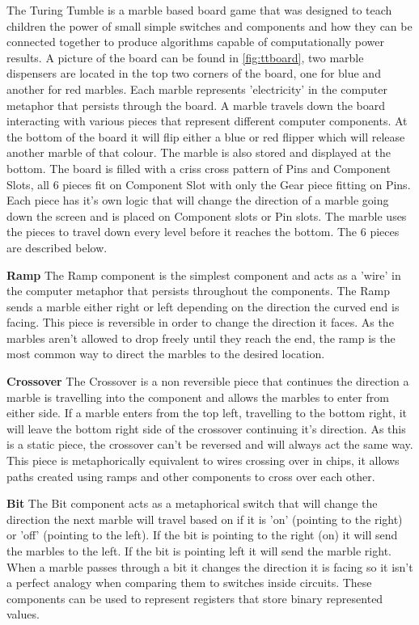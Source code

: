 \documentclass{l4proj}
\begin{document}
The Turing Tumble is a marble based board game that was designed to teach children the power of small simple switches and components and how they can be connected together to produce algorithms capable of computationally power results. A picture of the board can be found in \ref{fig:ttboard}, two marble dispensers are located in the top two corners of the board, one for blue and another for red marbles. Each marble represents 'electricity' in the computer metaphor that persists through the board. A marble travels down the board interacting with various pieces that represent different computer components. At the bottom of the board it will flip either a blue or red flipper which will release another marble of that colour. The marble is also stored and displayed at the bottom. The board is filled with a criss cross pattern of Pins and Component Slots, all 6 pieces fit on Component Slot with only the Gear piece fitting on Pins. Each piece has it's own logic that will change the direction of a marble going down the screen and is placed on Component slots or Pin slots. The marble uses the pieces to travel down every level before it reaches the bottom. The 6 pieces are described below.

\textbf{Ramp} 
The Ramp component is the simplest component and acts as a 'wire' in the computer metaphor that persists throughout the components. The Ramp sends a marble either right or left depending on the direction the curved end is facing. This piece is reversible in order to change the direction it faces. As the marbles aren't allowed to drop freely until they reach the end, the ramp is the most common way to direct the marbles to the desired location.

\textbf{Crossover}
The Crossover is a non reversible piece that continues the direction a marble is travelling into the component and allows the marbles to enter from either side.
If a marble enters from the top left, travelling to the bottom right, it will leave the bottom right side of the crossover continuing it's direction. As this is a static piece, the crossover can't be reversed and will always act the same way. This piece is metaphorically equivalent to wires crossing over in chips, it allows paths created using ramps and other components to cross over each other.

\textbf{Bit}
The Bit component acts as a metaphorical switch that will change the direction the next marble will travel based on if it is 'on' (pointing to the right) or 'off' (pointing to the left). If the bit is pointing to the right (on) it will send the marbles to the left. If the bit is pointing left it will send the marble right. When a marble passes through a bit it changes the direction it is facing so it isn't a perfect analogy when comparing them to switches inside circuits. These components can be used to represent registers that store binary represented values.
\end{document}
